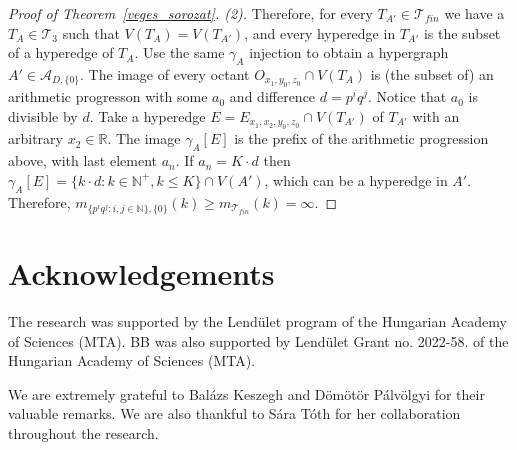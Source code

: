 \documentclass[11pt,oneside]{amsart}
\begin{document}
\begin{proof}[Proof of Theorem~\ref{veges_sorozat}. (2)]
Therefore, for every $T_{A'} \in \mathcal{T}_{fin}$ we have a $T_A \in \mathcal{T}_3$ such that $V(T_A) = V(T_{A'})$, and every hyperedge in $T_{A'}$ is the subset of a hyperedge of $T_A$. Use the same $\gamma_A$ injection to obtain a hypergraph $A' \in \mathcal{A}_{D,\{0\}}$. The image of every octant $O_{x_1,y_0,z_0} \cap V(T_A)$ is (the subset of) an arithmetic progresson with some $a_0$ and difference $d=p^iq^j$. Notice that $a_0$ is divisible by $d$. Take a hyperedge $E = E_{x_1,x_2,y_0,z_0} \cap V(T_{A'})$ of $T_{A'}$ with an arbitrary $x_2 \in \mathbb{R}$. The image $\gamma_A[E]$ is the prefix of the arithmetic progression above, with last element $a_n$. If $a_n = K \cdot d$ then $\gamma_A[E] = \{k \cdot d: k \in \mathbb{N}^+, k \leq K\} \cap V(A')$, which can be a hyperedge in $A'$.
Therefore, $m_{\{p^iq^j:i,j \in \mathbb{N}\},\{0\}}(k) \geq m_{\mathcal{T}_{fin}}(k) = \infty$.
\end{proof}

\section*{Acknowledgements}

The research was supported by the Lend\"ulet program of the Hungarian Academy of Sciences (MTA). BB was also supported by Lend\"ulet Grant no. 2022-58. of the Hungarian Academy of Sciences (MTA).

We are extremely grateful to Balázs Keszegh and Dömötör Pálvölgyi for their valuable remarks. We are also thankful to Sára Tóth for her collaboration throughout the research.







\end{document}
